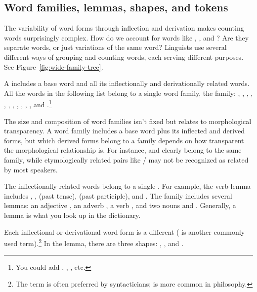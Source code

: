 \subsection{Word families, lemmas, shapes, and tokens}\label{sec:family-lemma-shape-token}

The variability of word forms through inflection and derivation makes counting words surprisingly complex. How do we account for words like , , and ? Are they separate words, or just variations of the same word? Linguists use several different ways of grouping and counting words, each serving different purposes. See Figure~\ref{fig:wide-family-tree}.

A  includes a base word and all its inflectionally and derivationally related words. All the words in the following list belong to a single word family, the  family: , , , , , , , , , , , and .\footnote{You could add , , , etc.}

The size and composition of word families isn't fixed but relates to morphological transparency. A word family includes a base word plus its inflected and derived forms, but which derived forms belong to a family depends on how transparent the morphological relationship is. For instance,  and  clearly belong to the same family, while etymologically related pairs like / may not be recognized as related by most speakers.

The inflectionally related words belong to a single . For example, the verb lemma  includes , ,  (past tense),  (past participle), and . The  family includes several lemmas: an adjective , an adverb , a verb , and two nouns  and . Generally, a lemma is what you look up in the dictionary.

Each inflectional or derivational word form is a different  ( is another commonly used term).\footnote{The term  is often preferred by syntacticians;  is more common in philosophy.} In the  lemma, there are three shapes: , , and .

